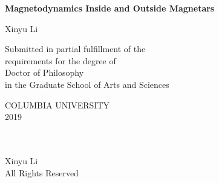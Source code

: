 
\newcommand{\thesistitle}{Magnetodynamics Inside and Outside Magnetars}
\newcommand{\thesisauthor}{Xinyu Li}
\newcommand{\thesisyear}{2019}


$\phantom{a}$

$\phantom{a}$

$\phantom{a}$

\begin{center}

{\LARGE \bf \thesistitle}

\vskip1.0in

{\Large  \thesisauthor} \vskip0.5in

\vskip1.5in

\large
Submitted in partial fulfillment of the \\
requirements for the degree of \\
Doctor of Philosophy \\
in the Graduate School of Arts and Sciences \\

\vskip0.5in

COLUMBIA UNIVERSITY \\
\thesisyear \\

\end{center}
\clearpage

\begin{center}
\ \\
\vskip6.5in
\textcopyright \thesisyear \\[3mm]
\thesisauthor \\
All Rights Reserved
\end{center}
\clearpage


